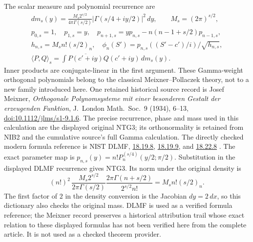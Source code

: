 \documentclass[11pt,a4paper]{article}
\begin{document}
The scalar measure and polynomial recurrence are
\[
\begin{gathered}
 dm_s(y)=\frac{M_s2^{s/2}}{4\pi\Gamma(s/2)}
              |\Gamma(s/4+iy/2)|^2\,dy,\qquad M_s=(2\pi)^{s/2},\\
 p_{0,s}=1,\quad p_{1,s}=y,\quad
 p_{n+1,s}=yp_{n,s}-n(n-1+s/2)p_{n-1,s},\\
 h_{n,s}=M_s n!(s/2)_n,\quad
 \phi_n(S')=p_{n,s}((S'-c')/i)/\sqrt{h_{n,s}},\\
 \langle P,Q\rangle_s=\int\overline{P(c'+iy)}Q(c'+iy)\,dm_s(y).
\end{gathered}                                                    \tag{NTG3}
\]
Inner products are conjugate-linear in the first argument.
These Gamma-weight orthogonal polynomials belong to the classical
Meixner--Pollaczek theory, not to a new family introduced here.
One retained historical source record is Josef Meixner,
\emph{Orthogonale Polynomsysteme mit einer besonderen Gestalt der
erzeugenden Funktion}, J.\ London Math.\ Soc.\ 9 (1934), 6--13,
\href{https://doi.org/10.1112/jlms/s1-9.1.6}{doi:10.1112/jlms/s1-9.1.6}.
The precise recurrence, phase and mass used in this calculation
are the displayed original NTG3; its orthonormality is retained
from NIB2 and the cumulative source's full Gamma calculation.
The directly checked modern formula reference is NIST DLMF,
\href{https://dlmf.nist.gov/18.19.E8}{18.19.8},
\href{https://dlmf.nist.gov/18.19.E9}{18.19.9}, and
\href{https://dlmf.nist.gov/18.22.E8}{18.22.8}
\cite[eqs.~(18.19.8)--(18.19.9), (18.22.8)]{human:dlmf18}.
The exact parameter map is
$p_{n,s}(y)=n!P_n^{(s/4)}(y/2;\pi/2)$.
Substitution in the displayed DLMF recurrence gives NTG3.
Its norm under the original density is
\[
 (n!)^2\,\frac{M_s2^{s/2}}{2\pi\Gamma(s/2)}
       \frac{2\pi\Gamma(n+s/2)}{2^{s/2}n!}
       =M_sn!(s/2)_n .
\]
The first factor of $2$ in the density conversion is the
Jacobian $dy=2\,dx$, so this dictionary also checks the
original mass. DLMF is used as a verified formula reference;
the Meixner record preserves a historical attribution trail whose
exact relation to these displayed formulas has not been verified here
from the complete article. It is not used as a checked theorem provider.
\end{document}
